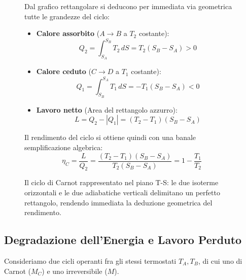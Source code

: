 \begin{figure}[ht]
\begin{minipage}{0.44\textwidth}
\end{minipage}\hfill
\begin{minipage}{0.52\textwidth}
Dal grafico rettangolare si deducono per immediata via geometrica tutte le grandezze del ciclo:
\begin{itemize}
    \item \textbf{Calore assorbito} ($A \to B$ a $T_2$ costante):
    \begin{equation}
        Q_2 = \int_{S_A}^{S_B} T_2\,dS = T_2 (S_B - S_A) > 0
    \end{equation}
    \item \textbf{Calore ceduto} ($C \to D$ a $T_1$ costante):
    \begin{equation}
        Q_1 = \int_{S_B}^{S_A} T_1\,dS = - T_1 (S_B - S_A) < 0
    \end{equation}
    \item \textbf{Lavoro netto} (Area del rettangolo azzurro):
    \begin{equation}
        L = Q_2 - |Q_1| = (T_2 - T_1)(S_B - S_A)
    \end{equation}
\end{itemize}
Il rendimento del ciclo si ottiene quindi con una banale semplificazione algebrica:
\begin{equation}
    \eta_C = \frac{L}{Q_2} = \frac{(T_2 - T_1)(S_B - S_A)}{T_2 (S_B - S_A)} = 1 - \frac{T_1}{T_2}
\end{equation}
\end{minipage}
\caption{Il ciclo di Carnot rappresentato nel piano T-S: le due isoterme orizzontali e le due adiabatiche verticali delimitano un perfetto rettangolo, rendendo immediata la deduzione geometrica del rendimento.}
\end{figure}

\subsection{Degradazione dell'Energia e Lavoro Perduto}
Consideriamo due cicli operanti fra gli stessi termostati $T_A, T_B$, di cui uno di Carnot ($M_C$) e uno irreversibile ($M$).

